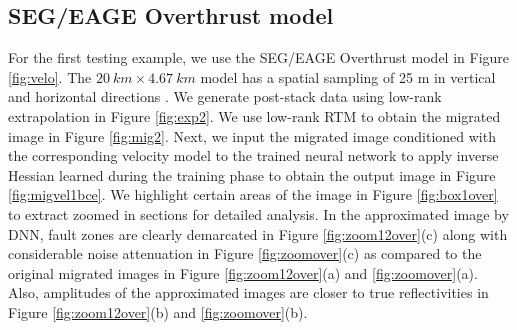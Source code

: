 \subsection{SEG/EAGE Overthrust model}
\hspace{\parindent} For the first testing example, we use the SEG/EAGE Overthrust model in Figure \ref{fig:velo}. The $20\ km\times4.67\ km$ model has a spatial sampling of 25 m in vertical and horizontal directions \cite[]{aminzadeh19953}. We generate post-stack data using low-rank extrapolation in Figure \ref{fig:exp2}. We use low-rank RTM to obtain the migrated image in Figure \ref{fig:mig2}. Next, we input the migrated image conditioned with the corresponding velocity model to the trained neural network to apply inverse Hessian learned during the training phase to obtain the output image in Figure \ref{fig:migvel1bce}. We highlight certain areas of the image in Figure \ref{fig:box1over} to extract zoomed in sections for detailed analysis. In the approximated image by DNN, fault zones are clearly demarcated in Figure \ref{fig:zoom12over}(c) along with considerable noise attenuation in Figure \ref{fig:zoomover}(c) as compared to the original migrated images in Figure \ref{fig:zoom12over}(a) and \ref{fig:zoomover}(a). Also, amplitudes of the approximated images are closer to true reflectivities in Figure \ref{fig:zoom12over}(b) and \ref{fig:zoomover}(b).%
 
